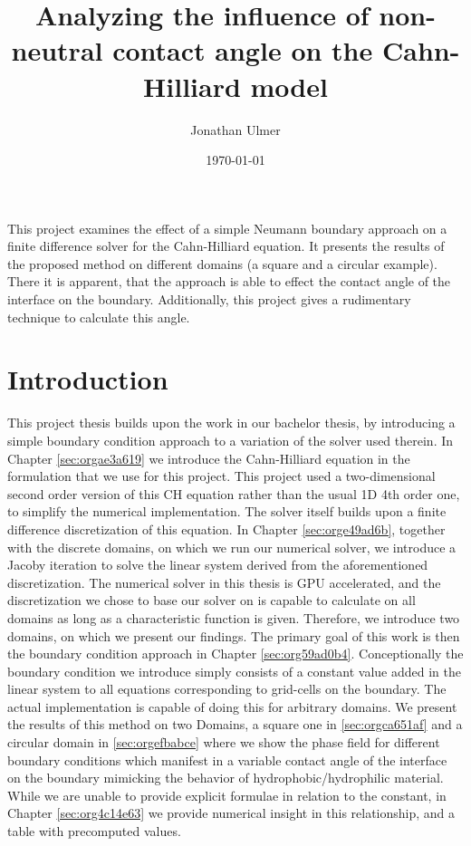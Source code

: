 \documentclass{mimosis}
\author{Jonathan Ulmer}
\date{\today}
\title{Analyzing the influence of non-neutral contact angle on the Cahn-Hilliard model}
\newenvironment{abstract} {}{}
\begin{document}
\maketitle
\setcounter{tocdepth}{1}
\tableofcontents

\begin{abstract}
This project examines the effect of a simple Neumann boundary approach on a finite difference solver for the Cahn-Hilliard equation. It presents the results of the proposed method on different domains (a square and a circular example). There it is apparent, that the approach is able to effect the contact angle of the interface on the boundary. Additionally, this project gives a rudimentary technique to calculate this angle.
\end{abstract}
\chapter{Introduction}
\label{sec:org5a596a9}
This project thesis builds upon the work in our bachelor thesis, by introducing a simple boundary condition approach to a variation of the solver used therein. In Chapter \ref{sec:orgae3a619} we introduce the Cahn-Hilliard equation in the formulation that we use for this project. This project used a two-dimensional second order version of this CH equation rather than the usual 1D 4th order one, to simplify the numerical implementation. The solver itself builds upon a finite difference discretization of this equation. In Chapter \ref{sec:orge49ad6b}, together with the discrete domains, on which we run our numerical solver, we introduce a Jacoby iteration to solve the linear system derived from the aforementioned discretization.  The numerical solver in this thesis is GPU accelerated, and the discretization we chose to base our solver on is capable to calculate on all domains as long as a characteristic function is given. Therefore, we introduce two domains, on which we present our findings. The primary goal of this work is then the boundary condition approach in Chapter \ref{sec:org59ad0b4}. Conceptionally the boundary condition we introduce simply consists of a constant value added in the linear system to all equations corresponding to grid-cells on the boundary. The actual implementation is capable of doing this for arbitrary domains. We present the results of this method on two Domains, a square one in \ref{sec:orgca651af} and a circular domain in \ref{sec:orgefbabce} where we show the phase field for different boundary conditions which manifest in a variable contact angle of the interface on the boundary mimicking the behavior of hydrophobic/hydrophilic material. While we are unable to provide explicit formulae in relation to the constant, in Chapter \ref{sec:org4c14e63} we provide numerical insight in this relationship, and a table with precomputed values.
\end{document}
